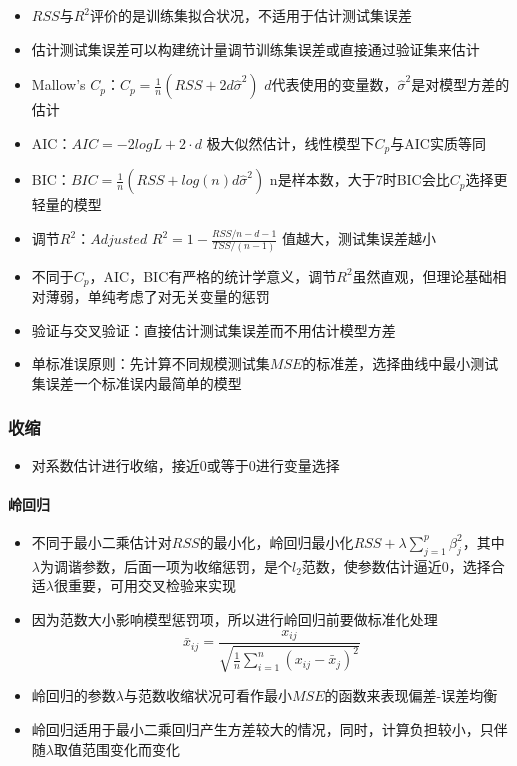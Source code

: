 \documentclass[
]{book}
\providecommand{\tightlist}{%
  \setlength{\itemsep}{0pt}\setlength{\parskip}{0pt}}
\begin{document}
\begin{itemize}
\tightlist
\item
  \(RSS\)与\(R^2\)评价的是训练集拟合状况，不适用于估计测试集误差
\item
  估计测试集误差可以构建统计量调节训练集误差或直接通过验证集来估计
\item
  Mallow's \(C_p\)：\(C_p = \frac{1}{n} (RSS + 2d\hat \sigma^2)\) \(d\)代表使用的变量数，\(\hat \sigma^2\)是对模型方差的估计
\item
  AIC：\(AIC = -2logL + 2 \cdot d\) 极大似然估计，线性模型下\(C_p\)与AIC实质等同
\item
  BIC：\(BIC = \frac{1}{n}(RSS + log(n)d\hat \sigma^2)\) n是样本数，大于7时BIC会比\(C_p\)选择更轻量的模型
\item
  调节\(R^2\)：\(Adjusted\) \(R^2 = 1 - \frac{RSS/n-d-1}{TSS/(n - 1)}\) 值越大，测试集误差越小
\item
  不同于\(C_p\)，AIC，BIC有严格的统计学意义，调节\(R^2\)虽然直观，但理论基础相对薄弱，单纯考虑了对无关变量的惩罚
\item
  验证与交叉验证：直接估计测试集误差而不用估计模型方差
\item
  单标准误原则：先计算不同规模测试集\(MSE\)的标准差，选择曲线中最小测试集误差一个标准误内最简单的模型
\end{itemize}

\hypertarget{ux6536ux7f29}{%
\subsubsection{收缩}\label{ux6536ux7f29}}

\begin{itemize}
\tightlist
\item
  对系数估计进行收缩，接近0或等于0进行变量选择
\end{itemize}

\hypertarget{ux5cadux56deux5f52}{%
\paragraph{岭回归}\label{ux5cadux56deux5f52}}

\begin{itemize}
\tightlist
\item
  不同于最小二乘估计对\(RSS\)的最小化，岭回归最小化\(RSS + \lambda \sum_{j = 1}^{p} \beta_j^2\)，其中\(\lambda\)为调谐参数，后面一项为收缩惩罚，是个\(l_2\)范数，使参数估计逼近0，选择合适\(\lambda\)很重要，可用交叉检验来实现
\item
  因为范数大小影响模型惩罚项，所以进行岭回归前要做标准化处理\[\bar x_{ij} = \frac{x_{ij}}{\sqrt{\frac{1}{n} \sum_{i = 1}^n (x_{ij} - \bar x_j)^2}}\]
\item
  岭回归的参数\(\lambda\)与范数收缩状况可看作最小\(MSE\)的函数来表现偏差-误差均衡
\item
  岭回归适用于最小二乘回归产生方差较大的情况，同时，计算负担较小，只伴随\(\lambda\)取值范围变化而变化
\end{itemize}
\end{document}
